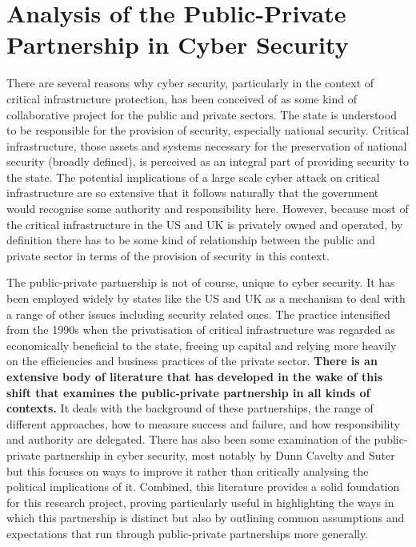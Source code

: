 \documentclass[a4paper,11pt]{article}
\begin{document}
\section{Analysis of the Public-Private Partnership in Cyber Security}

There are several reasons why cyber security, particularly in the
context of critical infrastructure protection, has been conceived of
as some kind of collaborative project for the public and private
sectors. The state is understood to be responsible for the provision
of security, especially national security. Critical infrastructure,
those assets and systems necessary for the preservation of national
security (broadly defined), is perceived as an integral part of
providing security to the state. The potential implications of a large
scale cyber attack on critical infrastructure are so extensive that it
follows naturally that the government would recognise some authority
and responsibility here. However, because most of the critical
infrastructure in the US and UK is privately owned and operated, by
definition there has to be some kind of relationship between the
public and private sector in terms of the provision of security in
this context. 

The public-private partnership is not of course, unique to cyber
security. It has been employed widely by states like the US and UK as
a mechanism to deal with a range of other issues including security
related ones. The practice intensified from the 1990s when the
privatisation of critical infrastructure was regarded as economically
beneficial to the state, freeing up capital and relying more heavily
on the efficiencies and business practices of the private
sector. {\textbf{There is an extensive body of literature that has developed in
the wake of this shift that examines the public-private partnership in
all kinds of contexts.}} It deals with the background of these
partnerships, the range of different approaches, how to measure
success and failure, and how responsibility and authority are
delegated. There has also been some examination of the public-private
partnership in cyber security, most notably by Dunn Cavelty and
Suter~\cite{dunncavelty+suter:2009} but this focuses on ways to
improve it rather than critically analysing the political implications
of it. Combined, this literature provides a solid foundation for this
research project, proving particularly useful in highlighting the ways
in which this partnership is distinct but also by outlining common
assumptions and expectations that run through public-private
partnerships more generally.
\end{document}
